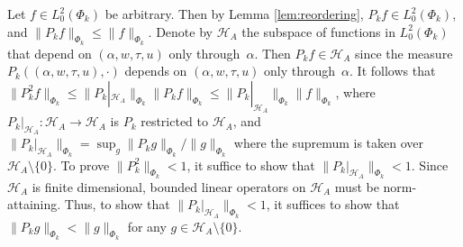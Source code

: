 \documentclass[12pt]{article}
\begin{document}
Let $f \in L_0^2(\Phi_k)$ be arbitrary.
Then by Lemma \ref{lem:reordering}, $P_k f \in L_0^2(\Phi_k)$, and $\|P_k f\|_{\Phi_k} \leq \|f\|_{\Phi_k}$.
Denote by $\mathcal{H}_A$ the subspace of functions in $L_0^2(\Phi_k)$ that depend on $(\alpha, w, \tau, u)$ only through~$\alpha$.
Then $P_k f \in \mathcal{H}_A$ since the measure $P_k((\alpha,w,\tau,u), \cdot)$ depends on $(\alpha,w,\tau,u)$ only through~$\alpha$.
It follows that $\|P_k^2 f\|_{\Phi_k} \leq \|P_k|_{\mathcal{H}_A}\|_{\Phi_k} \|P_k f\|_{\Phi_k} \leq \|P_k|_{\mathcal{H}_A}\|_{\Phi_k} \|f\|_{\Phi_k}$, where $P_k |_{\mathcal{H}_A}: \mathcal{H}_A \to \mathcal{H}_A$ is $P_k$ restricted to $\mathcal{H}_A$, and $\|P_k|_{\mathcal{H}_A}\|_{\Phi_k} = \sup_g \|P_k g\|_{\Phi_k}/\|g\|_{\Phi_k}$ where the supremum is taken over $\mathcal{H}_A \setminus \{0\}$.
To prove $\|P_k^2\|_{\Phi_k} < 1$, it suffice to show that $\|P_k |_{\mathcal{H}_A} \|_{\Phi_k} < 1$.
Since $\mathcal{H}_A$ is finite dimensional, bounded linear operators on $\mathcal{H}_A$ must be norm-attaining.
Thus, to show that  $\|P_k |_{\mathcal{H}_A} \|_{\Phi_k} < 1$, it suffices to show that $\|P_k g \|_{\Phi_k} < \|g\|_{\Phi_k}$ for any $g \in \mathcal{H}_A \setminus \{0\}$.
\end{document}

